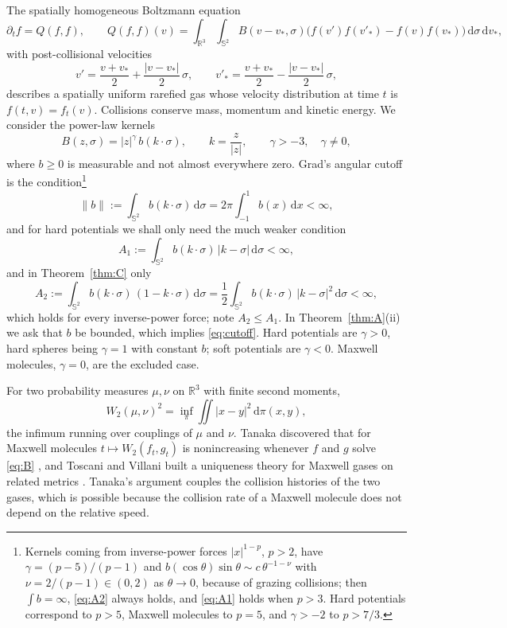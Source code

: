 \documentclass[11pt]{amsart}
\theoremstyle{definition}
\newcommand{\RR}{\mathbb{R}}
\newcommand{\Sph}{\mathbb{S}}
\newcommand{\dd}{\,\mathrm{d}}
\newcommand{\nb}{\|b\|}
\begin{document}
The spatially homogeneous Boltzmann equation
\begin{equation}\label{eq:B}
\partial_t f=Q(f,f),\qquad Q(f,f)(v)=\int_{\RR^3}\int_{\Sph^2}B(v-v_*,\sigma)\big(f(v')f(v'_*)-f(v)f(v_*)\big)\dd\sigma\dd v_*,
\end{equation}
with post-collisional velocities
\begin{equation}\label{eq:sigma}
v'=\frac{v+v_*}{2}+\frac{|v-v_*|}{2}\,\sigma,\qquad v'_*=\frac{v+v_*}{2}-\frac{|v-v_*|}{2}\,\sigma,
\end{equation}
describes a spatially uniform rarefied gas whose velocity distribution at time $t$ is $f(t,v)=f_t(v)$. Collisions conserve mass, momentum and kinetic energy. We consider the power-law kernels
\begin{equation}\label{eq:kernel}
B(z,\sigma)=|z|^\gamma\, b(k\cdot\sigma),\qquad k=\frac{z}{|z|},\qquad \gamma>-3,\quad \gamma\neq0,
\end{equation}
where $b\ge0$ is measurable and not almost everywhere zero. Grad's angular cutoff is the condition\footnote{Kernels coming from inverse-power forces $|x|^{1-p}$, $p>2$, have $\gamma=(p-5)/(p-1)$ and $b(\cos\theta)\sin\theta\sim c\,\theta^{-1-\nu}$ with $\nu=2/(p-1)\in(0,2)$ as $\theta\to0$, because of grazing collisions; then $\int b=\infty$, \eqref{eq:A2} always holds, and \eqref{eq:A1} holds when $p>3$. Hard potentials correspond to $p>5$, Maxwell molecules to $p=5$, and $\gamma>-2$ to $p>7/3$.}
\begin{equation}\label{eq:cutoff}
\nb:=\int_{\Sph^2}b(k\cdot\sigma)\dd\sigma=2\pi\int_{-1}^{1}b(x)\dd x<\infty ,
\end{equation}
and for hard potentials we shall only need the much weaker condition
\begin{equation}\label{eq:A1}
A_1:=\int_{\Sph^2}b(k\cdot\sigma)\,|k-\sigma|\dd\sigma<\infty ,
\end{equation}
and in Theorem~\ref{thm:C} only
\begin{equation}\label{eq:A2}
A_2:=\int_{\Sph^2}b(k\cdot\sigma)\,(1-k\cdot\sigma)\dd\sigma=\frac12\int_{\Sph^2}b(k\cdot\sigma)\,|k-\sigma|^2\dd\sigma<\infty ,
\end{equation}
which holds for every inverse-power force; note $A_2\le A_1$. In Theorem~\ref{thm:A}(ii) we ask that $b$ be bounded, which implies \eqref{eq:cutoff}. Hard potentials are $\gamma>0$, hard spheres being $\gamma=1$ with constant $b$; soft potentials are $\gamma<0$. Maxwell molecules, $\gamma=0$, are the excluded case.

For two probability measures $\mu,\nu$ on $\RR^3$ with finite second moments,
\[
W_2(\mu,\nu)^2=\inf_{\pi}\iint|x-y|^2\dd\pi(x,y),
\]
the infimum running over couplings of $\mu$ and $\nu$. Tanaka discovered that for Maxwell molecules $t\mapsto W_2(f_t,g_t)$ is nonincreasing whenever $f$ and $g$ solve \eqref{eq:B} \cite{Tan73,Tan78}, and Toscani and Villani built a uniqueness theory for Maxwell gases on related metrics \cite{TV99}. Tanaka's argument couples the collision histories of the two gases, which is possible because the collision rate of a Maxwell molecule does not depend on the relative speed.
\end{document}

